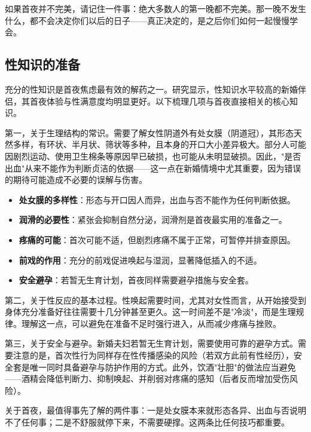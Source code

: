 \documentclass[12pt,UTF8]{ctexbook}
\newcommand{\keyword}[1]{\textbf{#1}}
\begin{document}
\begin{tcolorbox}[colback=pink!5!white,colframe=red!50!black,title=贴心小叮咛]
	如果首夜并不完美，请记住一件事：绝大多数人的第一晚都不完美。那一晚不发生什么，都不会决定你们以后的日子——真正决定的，是之后你们如何一起慢慢学会。
\end{tcolorbox}
\subsection{性知识的准备}

充分的性知识是首夜焦虑最有效的解药之一。研究显示，性知识水平较高的新婚伴侣，其首夜体验与性满意度均明显更好。以下梳理几项与首夜直接相关的核心知识。

第一，关于生理结构的常识。需要了解女性阴道外有处女膜（阴道冠），其形态天然多样，有环状、半月状、筛状等多种，且本身的开口大小差异极大。部分人可能因剧烈运动、使用卫生棉条等原因早已破损，也可能从未明显破损。因此，"是否出血"从来不能作为判断贞洁的依据——这一点在新婚情境中尤其重要，因为错误的期待可能造成不必要的误解与伤害。

\begin{itemize}
	\item \keyword{处女膜的多样性}：形态与开口因人而异，出血与否不能作为任何判断依据。
	\item \keyword{润滑的必要性}：紧张会抑制自然分泌，润滑剂是首夜最实用的准备之一。
	\item \keyword{疼痛的可能}：首次可能不适，但剧烈疼痛不属于正常，可暂停并排查原因。
	\item \keyword{前戏的作用}：充分的前戏促进唤起与湿润，显著降低插入的不适。
	\item \keyword{安全避孕}：若暂无生育计划，首夜同样需要避孕措施与安全套。
\end{itemize}

第二，关于性反应的基本过程。性唤起需要时间，尤其对女性而言，从开始接受到身体充分准备好往往需要十几分钟甚至更久。这一时间差不是"冷淡"，而是生理规律。理解这一点，可以避免在准备不足时强行进入，从而减少疼痛与挫败。

第三，关于安全与避孕。新婚夫妇若暂无生育计划，需要使用可靠的避孕方式。需要注意的是，首次性行为同样存在性传播感染的风险（若双方此前有性经历），安全套是唯一同时具备避孕与防护作用的方式。此外，饮酒"壮胆"的做法应当避免——酒精会降低判断力、抑制唤起、并削弱对疼痛的感知（后者反而增加受伤风险）。

\begin{tcolorbox}[colback=pink!5!white,colframe=red!50!black,title=贴心小叮咛]
	关于首夜，最值得事先了解的两件事：一是处女膜本来就形态各异、出血与否说明不了任何事；二是不舒服就停下来，不需要硬撑。这两条比任何技巧都重要。
\end{tcolorbox}
\end{document}

